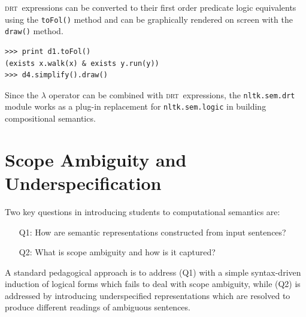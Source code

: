 \documentclass[11pt, a4paper]{article}
\newcommand{\DRT}{\textsc{drt}}
\begin{document}
\noindent
\DRT\ expressions can be converted to their first order predicate
logic equivalents using the \texttt{toFol()} method and can be
graphically rendered on screen with the \texttt{draw()} method.
\begin{Verbatim}[frame=none]
>>> print d1.toFol()
(exists x.walk(x) & exists y.run(y))
>>> d4.simplify().draw()
\end{Verbatim}

Since the $\lambda$ operator can be combined with \DRT\ expressions,
the \texttt{nltk.sem.drt} module works as a plug-in replacement for
\texttt{nltk.sem.logic} in building compositional semantics.

\section{Scope Ambiguity and Underspecification}

Two key questions in introducing students to computational semantics are:
\begin{enumerate}
\item[Q1:] How are semantic representations constructed from input
  sentences?
\vspace{-2ex}
\item[Q2:] What is scope ambiguity and how is it captured?
\end{enumerate}
A standard pedagogical approach is to address (Q1) with a simple
syntax-driven induction of logical forms which fails to deal with
scope ambiguity, while (Q2) is addressed by introducing underspecified
representations which are resolved to produce different readings of
ambiguous sentences.
\end{document}
